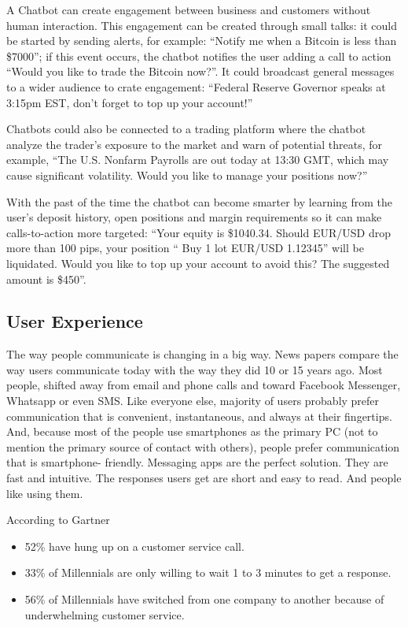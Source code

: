 \documentclass[	DIV=calc,%
							paper=letter,%
							fontsize=12pt%
                            ]{scrartcl}	 					%
\begin{document}
A Chatbot can create engagement between business and customers without human interaction. This engagement can be created through small talks: it could be started by sending alerts, for example: \textsf{``Notify me when a Bitcoin is less than \$7000''}; if this event occurs, the chatbot notifies the user adding a call to action \textsf{``Would you like to trade the Bitcoin now?''}. It could broadcast general messages to a wider audience to crate engagement: \textsf{``Federal Reserve Governor speaks at 3:15pm EST, don’t forget to top up your account!''}

Chatbots could also be connected to a trading platform where the chatbot analyze the trader’s exposure to the market and warn of potential threats, for example, \textsf{``The U.S. Nonfarm Payrolls are out today at 13:30 GMT, which may cause significant volatility. Would you like to manage your positions now?''}
 
With the past of the time the chatbot can become smarter by learning from the user’s deposit history, open positions and margin requirements so it can make calls-to-action more targeted: \textsf{``Your equity is \$1040.34. Should EUR/USD drop more than 100 pips, your position “ Buy 1 lot EUR/USD \@ 1.12345” will be liquidated. Would you like to top up your account to avoid this? The suggested amount is \$450''}.

\subsection{\label{sec:level2}User Experience}

The way people communicate is changing in a big way. News papers compare the way users communicate today with the way they did 10 or 15 years ago. Most people, shifted away from email and phone calls and toward Facebook Messenger, Whatsapp or even SMS. Like everyone else, majority of users probably prefer communication that is convenient, instantaneous, and always at their fingertips. And, because most of the people use smartphones as the primary PC (not to mention the primary source of contact with others), people prefer communication that is smartphone- friendly. Messaging apps are the perfect solution. They are fast and intuitive. The responses users get are short and easy to read. And people like using them.

According to Gartner\cite{holtgraves2007perceiving}
\begin{itemize}
\item 52\% have hung up on a customer service call. 
\item 33\% of Millennials are only willing to wait 1 to 3 minutes to get a response.\cite{lenhart2010teens} 
\item 56\% of Millennials have switched from one company to another because of underwhelming customer service.\cite{hsiao2016exploring}
\end{itemize}
\end{document}
